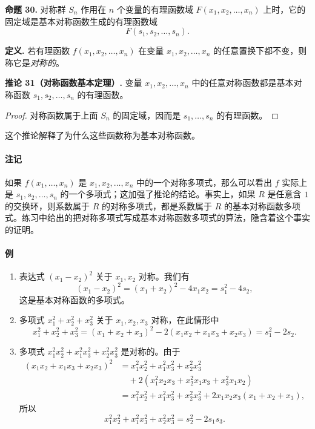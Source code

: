 \noindent\textbf{命题 30.} 对称群 $S_n$ 作用在 $n$ 个变量的有理函数域 $F(x_1,x_2,\ldots,x_n)$ 上时，它的固定域是基本对称函数生成的有理函数域
\[
F(s_1,s_2,\ldots,s_n).
\]

\noindent\textbf{定义.} 若有理函数 $f(x_1,x_2,\ldots,x_n)$ 在变量 $x_1,x_2,\ldots,x_n$ 的任意置换下都不变，则称它是\emph{对称的}。

\noindent\textbf{推论 31（对称函数基本定理）.} 变量 $x_1,x_2,\ldots,x_n$ 中的任意对称函数都是基本对称函数 $s_1,s_2,\ldots,s_n$ 的有理函数。

\begin{proof}
对称函数属于上面 $S_n$ 的固定域，因而是 $s_1,\ldots,s_n$ 的有理函数。
\end{proof}

这个推论解释了为什么这些函数称为基本对称函数。

\paragraph{注记}
如果 $f(x_1,\ldots,x_n)$ 是 $x_1,x_2,\ldots,x_n$ 中的一个对称多项式，那么可以看出 $f$ 实际上是 $s_1,s_2,\ldots,s_n$ 的一个多项式；这加强了推论的结论。事实上，如果 $R$ 是任意含 $1$ 的交换环，则系数属于 $R$ 的对称多项式，都是系数属于 $R$ 的基本对称函数多项式。练习中给出的把对称多项式写成基本对称函数多项式的算法，隐含着这个事实的证明。

\paragraph{例}
\begin{enumerate}[label=(\arabic*)]
\item 表达式 $(x_1-x_2)^2$ 关于 $x_1,x_2$ 对称。我们有
\[
(x_1-x_2)^2=(x_1+x_2)^2-4x_1x_2=s_1^2-4s_2,
\]
这是基本对称函数的多项式。

\item 多项式 $x_1^2+x_2^2+x_3^2$ 关于 $x_1,x_2,x_3$ 对称，在此情形中
\[
x_1^2+x_2^2+x_3^2=(x_1+x_2+x_3)^2-2(x_1x_2+x_1x_3+x_2x_3)=s_1^2-2s_2.
\]

\item 多项式 $x_1^2x_2^2+x_1^2x_3^2+x_2^2x_3^2$ 是对称的。由于
\[
\begin{aligned}
(x_1x_2+x_1x_3+x_2x_3)^2
&=x_1^2x_2^2+x_1^2x_3^2+x_2^2x_3^2 \\
&\quad+2(x_1^2x_2x_3+x_2^2x_1x_3+x_3^2x_1x_2)\\
&=x_1^2x_2^2+x_1^2x_3^2+x_2^2x_3^2+2x_1x_2x_3(x_1+x_2+x_3),
\end{aligned}
\]
所以
\[
x_1^2x_2^2+x_1^2x_3^2+x_2^2x_3^2=s_2^2-2s_1s_3.
\]
\end{enumerate}


